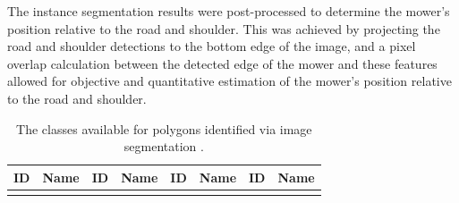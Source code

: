 \documentclass[
]{article}
\begin{document}
The instance segmentation results were post-processed to determine the
mower's position relative to the road and shoulder. This was achieved by
projecting the road and shoulder detections to the bottom edge of the
image, and a pixel overlap calculation between the detected edge of the
mower and these features allowed for objective and quantitative
estimation of the mower's position relative to the road and shoulder.

\begin{longtable}[]{@{}
  >{\raggedleft\arraybackslash}p{}
  >{\raggedright\arraybackslash}p{}
  >{\raggedleft\arraybackslash}p{}
  >{\raggedright\arraybackslash}p{}
  >{\raggedleft\arraybackslash}p{}
  >{\raggedright\arraybackslash}p{}
  >{\raggedleft\arraybackslash}p{}
  >{\raggedright\arraybackslash}p{}@{}}
\caption{\label{tbl:segments}The classes available for polygons
identified via image segmentation
\parencite{Sprague_ProgramAnnotateVideos_2024}.}\tabularnewline
\toprule\noalign{}
\begin{minipage}[b]{\linewidth}\raggedleft
ID
\end{minipage} & \begin{minipage}[b]{\linewidth}\raggedright
Name
\end{minipage} & \begin{minipage}[b]{\linewidth}\raggedleft
ID
\end{minipage} & \begin{minipage}[b]{\linewidth}\raggedright
Name
\end{minipage} & \begin{minipage}[b]{\linewidth}\raggedleft
ID
\end{minipage} & \begin{minipage}[b]{\linewidth}\raggedright
Name
\end{minipage} & \begin{minipage}[b]{\linewidth}\raggedleft
ID
\end{minipage} & \begin{minipage}[b]{\linewidth}\raggedright
Name
\end{minipage} \\
\midrule\noalign{}
\endfirsthead
\toprule\noalign{}
\begin{minipage}[b]{\linewidth}\raggedleft

\end{minipage}
\end{longtable}
\end{document}
